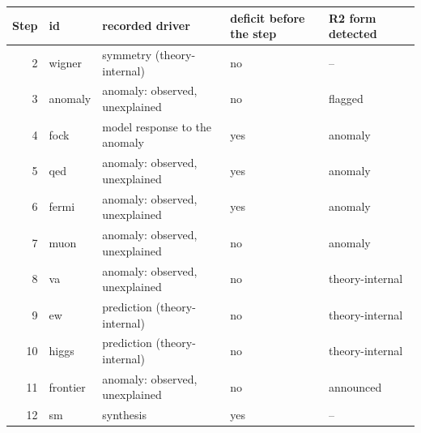 \begin{tabular}{@{}rlllp{4cm}@{}}\toprule
Step & id & recorded driver & deficit before the step & R2 form detected \\\midrule
2 & wigner & symmetry (theory-internal) & no & -- \\
3 & anomaly & anomaly: observed, unexplained & no & flagged \\
4 & fock & model response to the anomaly & yes & anomaly \\
5 & qed & anomaly: observed, unexplained & yes & anomaly \\
6 & fermi & anomaly: observed, unexplained & yes & anomaly \\
7 & muon & anomaly: observed, unexplained & no & anomaly \\
8 & va & anomaly: observed, unexplained & no & theory-internal \\
9 & ew & prediction (theory-internal) & no & theory-internal \\
10 & higgs & prediction (theory-internal) & no & theory-internal \\
11 & frontier & anomaly: observed, unexplained & no & announced \\
12 & sm & synthesis & yes & -- \\
\bottomrule\end{tabular}
